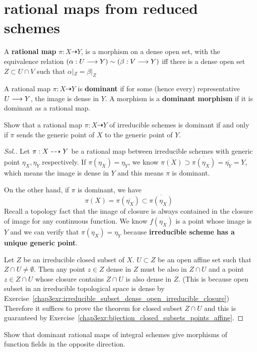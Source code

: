 \documentclass[11pt]{book} %
\begin{document}
\section{rational maps from reduced schemes}
\begin{definition}
A \textbf{rational map } $\pi:X\dashrightarrow Y$, is a morphism on a dense open set, with the equivalence relation $(\alpha:U\longrightarrow Y)\sim (\beta:V\longrightarrow Y)$ iff there is a dense open set $Z\subset U\cap V$ such that $\alpha|_Z=\beta|_Z$

A rational map $\pi:X\dashrightarrow Y$ is \textbf{dominant} if for some (hence every) representative $U\longrightarrow Y$, the image is dense in $Y$. A morphism is a \textbf{dominant morphism} if it is  dominant as a rational map.
\end{definition}
\begin{exr}\label{chap6exr:dominant_rational_map_generic_points}
Show that a rational map $\pi:X\dashrightarrow Y$ of irreducible schemes is dominant if and only if $\pi$ sends the generic point of $X$ to the generic point of $Y$.
\end{exr}
\begin{proof}[Sol.]
Let $\pi:X\dashrightarrow Y$ be a rational map between irreducible schemes with generic point $\eta_X,\eta_Y$ respectively. If $\pi(\eta_X)=\eta_Y$,  we know $\overline{\pi(X)}\supset \overline{\pi(\eta_X)}=\overline{\eta_Y}=Y$, which means the image is dense in $Y$ and this means $\pi$ is dominant.

On the other hand, if $\pi$ is dominant, we have
$$
\pi(X)=\pi(\overline{\eta_X})\subset \overline{\pi(\eta_X)}
$$
Recall a topology fact that the image of closure is always contained in the closure of image for any continuous function. We know $f(\eta_X)$ is a point whose image is $Y$ and we can verify that $\pi(\eta_X)=\eta_Y$ because \textbf{irreducible scheme has a unique generic point}.

Let $Z$ be an irreducible closed subset of $X$. $U\subset Z$ be an open affine set such that $Z\cap U\neq \emptyset$. Then any point $z\in Z$ dense in $Z$ must be also in $Z\cap U$ and a point $z\in Z\cap U$ whose closure contains $Z\cap U$ is also dense in $Z$. (This is because open subset in an irreducible topological space is dense by Exercise~\ref{chap3exr:irreducible_subset_dense_open_irreducible_closure}) Therefore it suffices to prove the theorem for closed subset $Z\cap U$ and this is guaranteed by Exercise~\ref{chap3exr:bijection_closed_subsets_points_affine}. 
\end{proof}
\begin{exr}
Show that dominant rational maps of integral schemes give morphisms of function fields in the opposite direction.
\end{exr}
\end{document}
